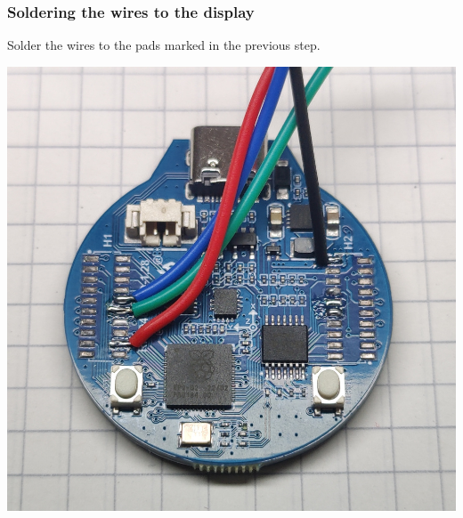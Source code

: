 \documentclass[]{article}
\begin{document}
\subsubsection{Soldering the wires to the display}
\begin{minipage}[t]{0.5\linewidth}
	\vspace{0pt}
	Solder the wires to the pads marked in the previous step.
\end{minipage}
\hfill
\begin{minipage}[t]{0.4\linewidth}
	\vspace{0pt}
	\includegraphics[width=\linewidth]{images/01_displayunit/04_solder_wires_to_display.jpg}
\end{minipage}
\end{document}
